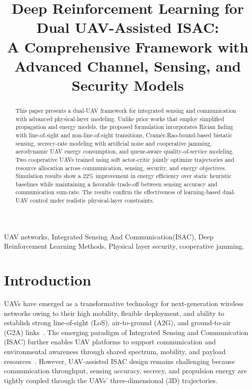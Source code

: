 \documentclass[journal]{IEEEtran}
\title{Deep Reinforcement Learning for Dual UAV-Assisted ISAC:\\ A Comprehensive Framework with Advanced Channel, Sensing, and Security Models}
\begin{document}
\maketitle

\begin{abstract}
This paper presents a dual-UAV framework for integrated sensing and communication with advanced physical-layer modeling. Unlike prior works that employ simplified propagation and energy models, the proposed formulation incorporates Rician fading with line-of-sight and non-line-of-sight transitions, Cram\'{e}r-Rao-bound-based bistatic sensing, secrecy-rate modeling with artificial noise and cooperative jamming, aerodynamic UAV energy consumption, and queue-aware quality-of-service modeling. Two cooperative UAVs trained using soft actor-critic jointly optimize trajectories and resource allocation across communication, sensing, security, and energy objectives. Simulation results show a 22\% improvement in energy efficiency over static heuristic baselines while maintaining a favorable trade-off between sensing accuracy and communication sum-rate. The results confirm the effectiveness of learning-based dual-UAV control under realistic physical-layer constraints.
\end{abstract}

\begin{IEEEkeywords}
UAV networks, Integrated Sensing And Communication(ISAC), Deep Reinforcement Learning Methods, Physical layer security, cooperative jamming.
\end{IEEEkeywords}

\section{Introduction}
\label{sec:intro}

UAVs have emerged as a transformative technology for next-generation wireless networks owing to their high mobility, flexible deployment, and ability to establish strong line-of-sight (LoS), air-to-ground (A2G), and ground-to-air (G2A) links~\cite{khuwaja2018survey, kurunathan2024mluav}. The emerging paradigm of Integrated Sensing and Communication (ISAC) further enables UAV platforms to support communication and environmental awareness through shared spectrum, mobility, and payload resources~\cite{wu2023uavisac, meng2024isacsurvey}. However, UAV-assisted ISAC design remains challenging because communication throughput, sensing accuracy, secrecy, and propulsion energy are tightly coupled through the UAVs' three-dimensional (3D) trajectories.
\end{document}
